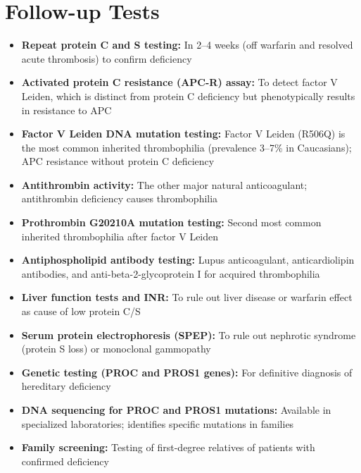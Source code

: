\section*{Follow-up Tests}
\begin{itemize}
  \item \textbf{Repeat protein C and S testing:} In 2--4 weeks (off warfarin and resolved acute thrombosis) to confirm deficiency
  \item \textbf{Activated protein C resistance (APC-R) assay:} To detect factor V Leiden, which is distinct from protein C deficiency but phenotypically results in resistance to APC
  \item \textbf{Factor V Leiden DNA mutation testing:} Factor V Leiden (R506Q) is the most common inherited thrombophilia (prevalence 3--7\% in Caucasians); APC resistance without protein C deficiency
  \item \textbf{Antithrombin activity:} The other major natural anticoagulant; antithrombin deficiency causes thrombophilia
  \item \textbf{Prothrombin G20210A mutation testing:} Second most common inherited thrombophilia after factor V Leiden
  \item \textbf{Antiphospholipid antibody testing:} Lupus anticoagulant, anticardiolipin antibodies, and anti-beta-2-glycoprotein I for acquired thrombophilia
  \item \textbf{Liver function tests and INR:} To rule out liver disease or warfarin effect as cause of low protein C/S
  \item \textbf{Serum protein electrophoresis (SPEP):} To rule out nephrotic syndrome (protein S loss) or monoclonal gammopathy
  \item \textbf{Genetic testing (PROC and PROS1 genes):} For definitive diagnosis of hereditary deficiency
  \item \textbf{DNA sequencing for PROC and PROS1 mutations:} Available in specialized laboratories; identifies specific mutations in families
  \item \textbf{Family screening:} Testing of first-degree relatives of patients with confirmed deficiency
\end{itemize}

